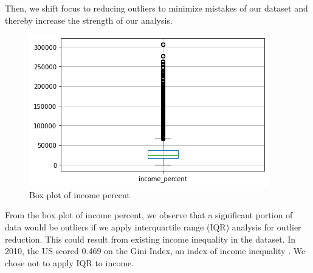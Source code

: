 \documentclass{article}
\begin{document}
Then, we shift focus to reducing outliers to minimize mistakes of our dataset and thereby increase the strength of our analysis.


\begin{figure}[H]
    \centering
    \includegraphics[scale = 0.5]{income_percent_box_plot.png}
    \caption{Box plot of income percent}
    \label{fig:my_label}
\end{figure}

From the box plot of income percent, we observe that a significant portion of data would be outliers if we apply interquartile range (IQR) analysis for outlier reduction. This could result from existing income inequality in the dataset. In 2010, the US scored 0.469 on the Gini Index, an index of income inequality \cite{6}. We chose not to apply IQR to income.
\end{document}
